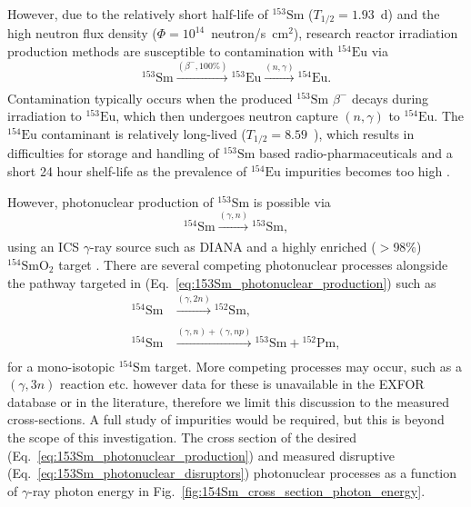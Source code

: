 \documentclass[../main.tex]{subfiles}
\begin{document}
However, due to the relatively short half-life of $^{153}\mathrm{Sm}$ ($T_{1/2} = 1.93$~\si{\day}) and the high neutron flux density ($\Phi=10^{14}$~neutron/\si{\second\centi\meter}$^{2}$), research reactor irradiation production methods are susceptible to contamination with $^{154}\mathrm{Eu}$ \cite{naseri2021effective,van2018separation} via
\begin{equation}
^{153}\mathrm{Sm}\xrightarrow[]{\left(\beta^{-},\mathrm{100\%}\right)}{}^{153}\mathrm{Eu}\xrightarrow[]{\left(n,\gamma\right)}{}^{154}\mathrm{Eu}.
\label{eq:153Sm_reactor_contamination}    
\end{equation}
Contamination typically occurs when the produced $^{153}\mathrm{Sm}$ $\beta^{-}$ decays during irradiation to $^{153}\mathrm{Eu}$, which then undergoes neutron capture $\left(n,\gamma\right)$ to $^{154}\mathrm{Eu}$. The $^{154}\mathrm{Eu}$ contaminant is relatively long-lived ($T_{1/2} = 8.59$~), which results in difficulties for storage and handling of $^{153}\mathrm{Sm}$ based radio-pharmaceuticals and a short 24 hour shelf-life \cite{ema2015quadramet} as the prevalence of $^{154}\mathrm{Eu}$ impurities becomes too high \cite{van2018separation}.

However, photonuclear production of $^{153}\mathrm{Sm}$ \cite{carlos1974giant,filipescu2014photoneutron} is possible via
\begin{equation}
^{154}\mathrm{Sm}\xrightarrow[]{\left(\gamma,n\right)}{}^{153}\mathrm{Sm},
\label{eq:153Sm_photonuclear_production}    
\end{equation}
using an ICS $\gamma$-ray source such as DIANA and a highly enriched ($>$98\%) $^{154}\mathrm{SmO}_{2}$ target \cite{bell1987stable,isoflex2021sm}. There are several competing photonuclear processes alongside the pathway targeted in (Eq.~\ref{eq:153Sm_photonuclear_production}) such as \cite{carlos1974giant}
\begin{align}
^{154}\mathrm{Sm}&\xrightarrow[]{\left(\gamma,2n\right)}{}^{152}\mathrm{Sm},\\
^{154}\mathrm{Sm}&\xrightarrow[]{\left(\gamma,n\right)+\left(\gamma,np\right)}{}^{153}\mathrm{Sm}+{}^{152}\mathrm{Pm},
\label{eq:153Sm_photonuclear_disruptors}    
\end{align}
for a mono-isotopic $^{154}\mathrm{Sm}$ target. More competing processes may occur, such as a $\left(\gamma,3n\right)$ reaction etc. however data for these is unavailable in the EXFOR database \cite{zerkin2018experimental} or in the literature, therefore we limit this discussion to the measured cross-sections. A full study of impurities would be required, but this is beyond the scope of this investigation.   The cross section of the desired (Eq.~\ref{eq:153Sm_photonuclear_production}) and measured disruptive (Eq.~\ref{eq:153Sm_photonuclear_disruptors}) photonuclear processes as a function of $\gamma$-ray photon energy in Fig.~\ref{fig:154Sm_cross_section_photon_energy}.
\end{document}
